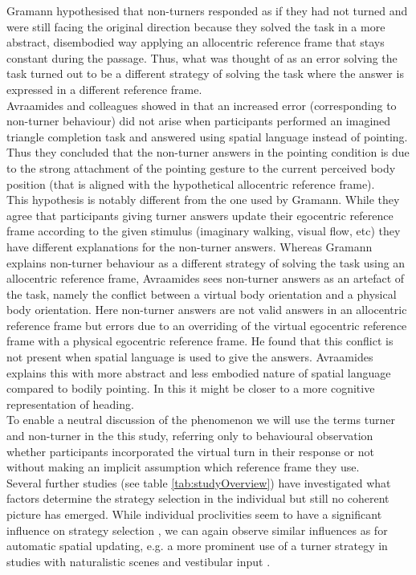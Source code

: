 \documentclass{frontiersSCNS} %
\begin{document}
Gramann hypothesised that non-turners responded as if they had not turned and were still facing the original direction because they solved the task in a more abstract, disembodied way applying an allocentric reference frame that stays constant during the passage. Thus, what was thought of as an error solving the task turned out to be a different strategy of solving the task where the answer is expressed in a different reference frame.\\
Avraamides and colleagues showed in \citep{Avraamides2004} that an increased error (corresponding to non-turner behaviour) did not arise when participants performed an imagined triangle completion task and answered using spatial language instead of pointing. Thus they concluded that the non-turner answers in the pointing condition is due to the strong attachment of the pointing gesture to the current perceived body position (that is aligned with the hypothetical allocentric reference frame). \\
This hypothesis is notably different from the one used by Gramann. While they agree that participants giving turner answers update their egocentric reference frame according to the given stimulus (imaginary walking, visual flow, etc) they have different explanations for the non-turner answers. Whereas Gramann explains non-turner behaviour as a different strategy of solving the task using an allocentric reference frame, Avraamides sees non-turner answers as an artefact of the task, namely the conflict between a virtual body orientation and a physical body orientation. Here non-turner answers are not valid answers in an allocentric reference frame but errors due to an overriding of the virtual egocentric reference frame with a physical egocentric reference frame. He found that this conflict is not present when spatial language is used to give the answers. Avraamides explains this with more abstract and less embodied nature of spatial language compared to bodily pointing. In this it might be closer to a more cognitive representation of heading.\\
To enable a neutral discussion of the phenomenon we will use the terms turner and non-turner in the this study, referring only to behavioural observation whether participants incorporated the virtual turn in their response or not without making an implicit assumption which reference frame they use.\\
Several further studies (see table \ref{tab:studyOverview}) have investigated what factors determine the strategy selection in the individual but still no coherent picture has emerged. While individual proclivities seem to have a significant influence on strategy selection \citep{Gramann2011}, we can again observe similar influences as for automatic spatial updating, e.g. a more prominent use of a turner strategy in studies with naturalistic scenes and vestibular input \citep{Sigurdarson}. 
\end{document}
